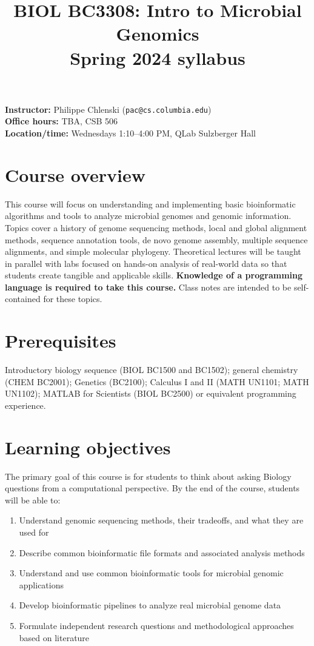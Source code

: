 \documentclass{article}
\title{BIOL BC3308: Intro to Microbial Genomics\\
Spring 2024 syllabus}
\date{}
\begin{document}
\maketitle{} \noindent
\textbf{Instructor: } Philippe Chlenski (\texttt{pac@cs.columbia.edu})\\
\textbf{Office hours: } TBA, CSB 506\\
\textbf{Location/time: } Wednesdays 1:10--4:00 PM, QLab Sulzberger Hall

\section*{Course overview}
This course will focus on understanding and implementing basic bioinformatic algorithms and tools to analyze microbial genomes and genomic information. Topics cover a history of genome sequencing methods, local and global alignment methods, sequence annotation tools, de novo genome assembly, multiple sequence alignments, and simple molecular phylogeny. Theoretical lectures will be taught in parallel with labs focused on hands-on analysis of real-world data so that students create tangible and applicable skills. \textbf{Knowledge of a programming language is required to take this course.} Class notes are intended to be self-contained for these topics.

\section*{Prerequisites}
Introductory biology sequence (BIOL BC1500 and BC1502); general chemistry (CHEM BC2001); Genetics (BC2100); Calculus I and II (MATH UN1101; MATH UN1102); MATLAB for Scientists (BIOL BC2500) or equivalent programming experience.

\section*{Learning objectives}
The primary goal of this course is for students to think about asking Biology questions from a computational perspective. By the end of the course, students will be able to: 
\begin{enumerate}
    \item Understand genomic sequencing methods, their tradeoffs, and what they are used for
    \item Describe common bioinformatic file formats and associated analysis methods
    \item Understand and use common bioinformatic tools for microbial genomic applications 
    \item Develop bioinformatic pipelines to analyze real microbial genome data
    \item Formulate independent research questions and methodological approaches based on literature 
\end{enumerate}
\end{document}
